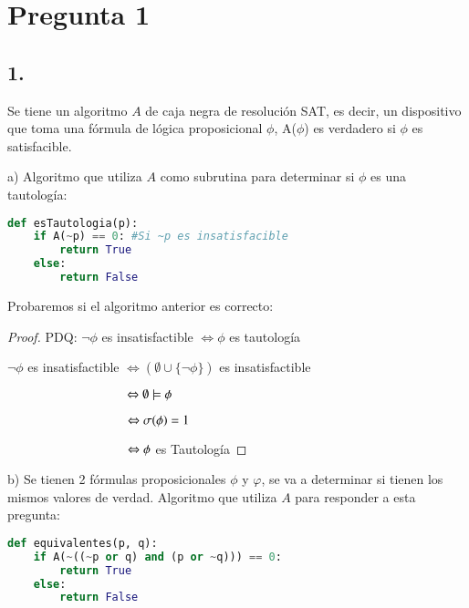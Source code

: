 \documentclass[
	spanish, %
	letterpaper, oneside
]{article}
\begin{document}
\templatePortrait

\templatePagecfg

\templateFinalcfg


\section*{Pregunta 1}
\subsection*{1.}
Se tiene un  algoritmo $A$ de caja negra de resolución SAT, es decir, un dispositivo que toma una fórmula de lógica proposicional $\phi$, A($\phi$) es verdadero si $\phi$ es satisfacible.


a) Algoritmo que utiliza $A$ como subrutina para determinar si $\phi$ es una tautología:

\begin{lstlisting}[language=Python]
def esTautologia(p):
    if A(~p) == 0: #Si ~p es insatisfacible
        return True
    else:
        return False
\end{lstlisting}
Probaremos si el algoritmo anterior es correcto:
\begin{proof}

    PDQ: $\neg \phi$ es insatisfactible $\Leftrightarrow \phi$ es tautología
    
    $\neg \phi$ es insatisfactible $\Leftrightarrow (\emptyset \cup \{\neg \phi\})$ es insatisfactible
    
    $\hspace{33mm} \Leftrightarrow \emptyset \models \phi$

    $\hspace{33mm} \Leftrightarrow \sigma(\phi) = 1$

    $\hspace{33mm} \Leftrightarrow \phi$ es Tautología
\end{proof}

b) Se tienen 2 fórmulas proposicionales $\phi$ y $\varphi$, se va a determinar si tienen los mismos valores de verdad. Algoritmo que utiliza $A$ para responder a esta pregunta:

\begin{lstlisting}[language=Python]
def equivalentes(p, q):
    if A(~((~p or q) and (p or ~q))) == 0:
        return True
    else:
        return False
\end{lstlisting}
\end{document}
